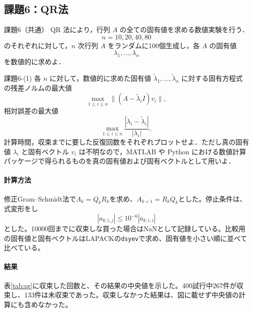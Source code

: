 \documentclass[a4paper,11pt]{article}
\begin{document}
\subsection{課題6：QR法}
\begin{itembox}[l]{課題6（共通）}
QR 法により，行列 $A$ の全ての固有値を求める数値実験を行う．
\[n=10,20,40,80\]
のそれぞれに対して，$n$ 次行列 $A$ をランダムに100個生成し，各 $A$ の固有値
\[\lambda_1,\ldots,\lambda_n\]
を数値的に求めよ．
\end{itembox}
\begin{itembox}[l]{課題6-(1)}
各 $n$ に対して，数値的に求めた固有値 $\tilde\lambda_1,\ldots,\tilde\lambda_n$ に対する固有方程式の残差ノルムの最大値
\begin{equation*}\max_{1\le i\le n}\|(A-\tilde\lambda_i I)v_i\|,\end{equation*}
相対誤差の最大値
\begin{equation*}\max_{1\le i\le n}\frac{|\lambda_i-\tilde\lambda_i|}{|\lambda_i|},\end{equation*}
計算時間，収束までに要した反復回数をそれぞれプロットせよ．ただし真の固有値 $\lambda_i$ と固有ベクトル $v_i$ は不明なので，MATLAB や Python における数値計算パッケージで得られるものを真の固有値および固有ベクトルとして用いよ．
\end{itembox}
\paragraph{計算方法}
修正Gram--Schmidt法で$A_k=Q_kR_k$を求め、$A_{k+1}=R_kQ_k$とした。停止条件は、式変形をし
\begin{equation}|a_{k;i,j}|\leq10^{-6}|a_{k;i,i}|\label{eq:qr-stop}\end{equation}
とした。10000回までに収束しな買った場合はNaNとして記録している。比較用の固有値と固有ベクトルはLAPACKの\texttt{dsyev}で求め、固有値を小さい順に並べて比べている。

\paragraph{結果}
表\ref{tab:qr}に収束した回数と、その結果の中央値を示した。400試行中267件が収束し、133件は未収束であった。収束しなかった結果は、図に載せず中央値の計算にも含めなかった。
\end{document}
